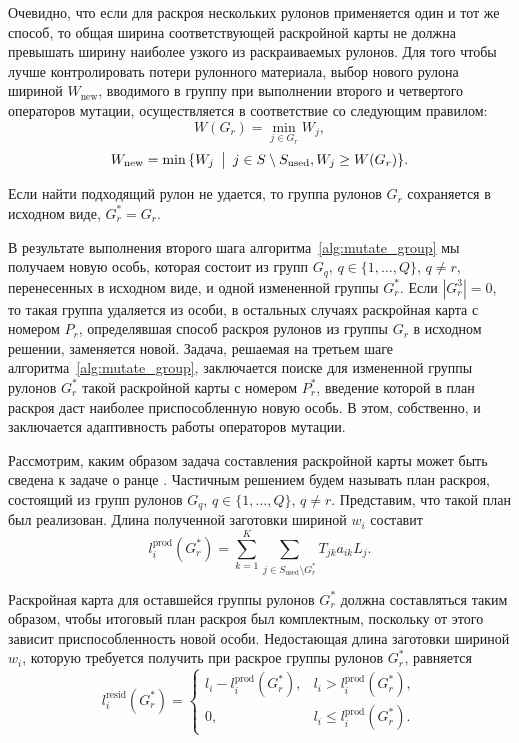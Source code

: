 \documentclass[12pt]{article}
\begin{document}
Очевидно, что если для раскроя нескольких рулонов применяется один и тот же 
способ, то общая ширина соответствующей раскройной карты не должна превышать 
ширину наиболее узкого из раскраиваемых рулонов. Для того чтобы лучше 
контролировать потери рулонного материала, выбор нового рулона шириной 
$W_{\text{new}}$, вводимого в группу при выполнении второго и четвертого 
операторов мутации, осуществляется в соответствие со следующим правилом:
\[W(G_r)=\min_{j \in G_r}{W_j},\]
\[W_{\text{new}}=\min{\{ W_j \: \bigm| \: j \in S \setminus S_{\text{used}}, W_j \geq W(G_r) \}}.\]

Если найти подходящий рулон не удается, то группа рулонов $G_r$ сохраняется 
в исходном виде, $G_r^*=G_r$.

В результате выполнения второго шага алгоритма~\ref{alg:mutate_group} 
мы получаем новую 
особь, которая состоит из групп $G_q$, $q \in \{1,\ldots,Q\}$, $q \neq r$, 
перенесенных в исходном виде, и одной измененной группы $G_r^*$. Если 
$|G_r^3|=0$, то такая группа удаляется из особи, в остальных случаях 
раскройная карта с номером $P_r$, определявшая способ раскроя рулонов из 
группы $G_r$ в исходном решении, заменяется новой. Задача, решаемая на третьем 
шаге алгоритма~\ref{alg:mutate_group}, заключается поиске для измененной 
группы рулонов $G_r^*$ такой 
раскройной карты с номером $P_r^*$, введение которой в план раскроя даст 
наиболее приспособленную новую особь. В этом, собственно, и заключается 
адаптивность работы операторов мутации.

Рассмотрим, каким образом задача составления раскройной карты может быть 
сведена к задаче о ранце 
\cite{martello90}. 
Частичным решением будем называть план 
раскроя, состоящий из групп рулонов $G_q$, $q \in \{1,\ldots,Q\}$, $q \neq r$. 
Представим, что такой план был реализован. Длина полученной заготовки шириной 
$w_i$ составит
\[ l_{i}^{\text{prod}}(G_r^*)=\sum_{k=1}^{K} \sum_{j \in S_{\text{used}} \setminus G_r^*} T_{jk} a_{ik} L_j. \]

Раскройная карта для оставшейся группы рулонов $G_r^*$ должна составляться 
таким образом, чтобы итоговый план раскроя был комплектным, поскольку от этого 
зависит приспособленность новой особи. Недостающая длина заготовки шириной 
$w_i$, которую требуется получить при раскрое группы рулонов $G_r^*$, равняется
\[ l_{i}^{\text{resid}}(G_r^*)=
    \begin{cases}
        l_i-l_{i}^{\text{prod}}(G_r^*), & l_i > l_{i}^{\text{prod}}(G_r^*), \\
        0, & l_i \leq l_{i}^{\text{prod}}(G_r^*).
    \end{cases} \]
\end{document}
